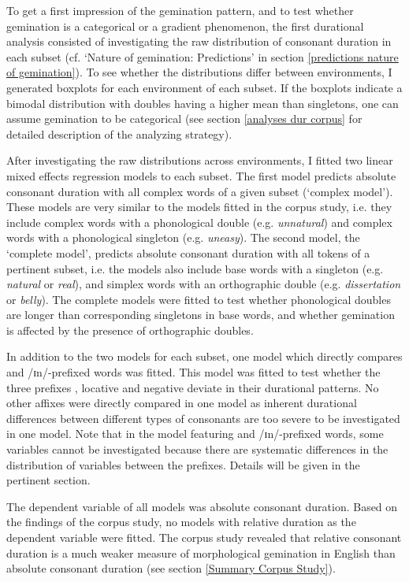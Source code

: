 To get a first impression of the gemination pattern, and to test whether gemination is a categorical or a gradient phenomenon, the first durational analysis consisted of investigating the raw distribution of consonant duration in each subset (cf. `Nature of gemination: Predictions' in section \ref{predictions nature of gemination}). To see whether the distributions differ between environments, I generated boxplots for each environment of each subset. 
If the boxplots indicate a bimodal distribution with doubles having a higher mean than singletons, one can assume gemination to be categorical (see section \ref{analyses dur corpus} for detailed description of the analyzing strategy). 

After investigating the raw distributions across environments, I fitted two linear mixed effects regression models to each subset. 
The first model predicts absolute consonant duration with all complex words of a given subset (`complex model'). These models are very similar to the models fitted in the corpus study, i.e. they include complex words with a phonological double (e.g. \textit{unnatural}) and complex words with a phonological singleton (e.g. \textit{uneasy}). 
The second model, the `complete model', predicts absolute consonant duration with all tokens of a pertinent subset, i.e. the models also include base words with a singleton (e.g. \textit{natural} or \textit{real}), and simplex words with an orthographic double (e.g. \textit{dissertation} or \textit{belly}). The complete models were fitted to test whether phonological doubles are longer than corresponding singletons in base words, and whether gemination is affected by the presence of orthographic doubles. 

In addition to the two models for each subset, one model which directly compares  and /ɪn/-prefixed words was fitted. This model was fitted to test whether the three prefixes , locative  and negative  deviate in their durational patterns. No other affixes were directly compared in one model as inherent durational differences between different types of consonants are too severe to be investigated in one model. Note that in the model featuring  and /ɪn/-prefixed words, some variables cannot be investigated because there are systematic differences in the distribution of variables between the prefixes. Details will be given in the pertinent section.


The dependent variable of all models was absolute consonant duration. Based on the findings of the corpus study, no models with relative duration as the dependent variable were fitted.  The corpus study revealed that relative consonant duration is a much weaker measure of morphological gemination in English than absolute consonant duration (see section \ref{Summary Corpus Study}).

